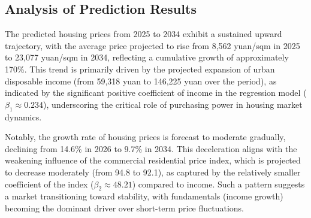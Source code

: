 \documentclass{mcmthesis}
\begin{document}
\subsection{Analysis of Prediction Results} %

The predicted housing prices from 2025 to 2034 exhibit a sustained upward trajectory, 
with the average price projected to rise from 8,562 yuan/sqm in 2025 to 23,077 yuan/sqm in 2034, 
reflecting a cumulative growth of approximately 170\%. 
This trend is primarily driven by the projected expansion of urban disposable income 
(from 59,318 yuan to 146,225 yuan over the period), 
as indicated by the significant positive coefficient of income in the regression model ($\beta_1 \approx 0.234$), 
underscoring the critical role of purchasing power in housing market dynamics.


Notably, the growth rate of housing prices is forecast to moderate gradually, 
declining from 14.6\% in 2026 to 9.7\% in 2034. 
This deceleration aligns with the weakening influence of the commercial residential price index, 
which is projected to decrease moderately (from 94.8 to 92.1), 
as captured by the relatively smaller coefficient of the index ($\beta_2 \approx 48.21$) compared to income. 
Such a pattern suggests a market transitioning toward stability,
with fundamentals (income growth) becoming the dominant driver over short-term price fluctuations.
\end{document}
